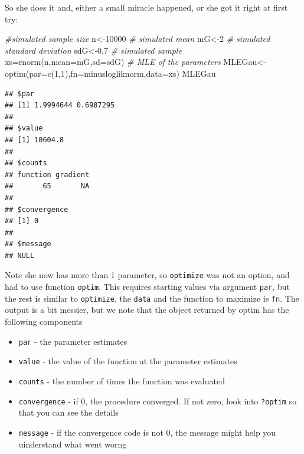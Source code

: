 \documentclass[
]{book}
\newenvironment{Shaded}{\begin{snugshade}}{\end{snugshade}}
\newcommand{\AttributeTok}[1]{\textcolor[rgb]{0.77,0.63,0.00}{#1}}
\newcommand{\CommentTok}[1]{\textcolor[rgb]{0.56,0.35,0.01}{\textit{#1}}}
\newcommand{\DecValTok}[1]{\textcolor[rgb]{0.00,0.00,0.81}{#1}}
\newcommand{\FloatTok}[1]{\textcolor[rgb]{0.00,0.00,0.81}{#1}}
\newcommand{\FunctionTok}[1]{\textcolor[rgb]{0.00,0.00,0.00}{#1}}
\newcommand{\NormalTok}[1]{#1}
\newcommand{\OtherTok}[1]{\textcolor[rgb]{0.56,0.35,0.01}{#1}}
\providecommand{\tightlist}{%
  \setlength{\itemsep}{0pt}\setlength{\parskip}{0pt}}
\begin{document}
So she does it and, either a small miracle happened, or she got it right at first try:

\begin{Shaded}
\begin{Highlighting}[]
\CommentTok{\#simulated sample size}
\NormalTok{n}\OtherTok{\textless{}{-}}\DecValTok{10000}
\CommentTok{\# simulated mean}
\NormalTok{mG}\OtherTok{\textless{}{-}}\DecValTok{2}
\CommentTok{\# simulated standard deviation}
\NormalTok{sdG}\OtherTok{\textless{}{-}}\FloatTok{0.7}
\CommentTok{\# simulated sample}
\NormalTok{xs}\OtherTok{=}\FunctionTok{rnorm}\NormalTok{(n,}\AttributeTok{mean=}\NormalTok{mG,}\AttributeTok{sd=}\NormalTok{sdG)}
\CommentTok{\# MLE of the parameters}
\NormalTok{MLEGau}\OtherTok{\textless{}{-}}\FunctionTok{optim}\NormalTok{(}\AttributeTok{par=}\FunctionTok{c}\NormalTok{(}\DecValTok{1}\NormalTok{,}\DecValTok{1}\NormalTok{),}\AttributeTok{fn=}\NormalTok{minuslogliknorm,}\AttributeTok{data=}\NormalTok{xs)}
\NormalTok{MLEGau}
\end{Highlighting}
\end{Shaded}

\begin{verbatim}
## $par
## [1] 1.9994644 0.6987295
## 
## $value
## [1] 10604.8
## 
## $counts
## function gradient 
##       65       NA 
## 
## $convergence
## [1] 0
## 
## $message
## NULL
\end{verbatim}

Note she now has more than 1 parameter, so \texttt{optimize} was not an option, and had to use function \texttt{optim}. This requires starting values via argument \texttt{par}, but the rest is similar to \texttt{optimize}, the \texttt{data} and the function to maximize is \texttt{fn}. The output is a bit messier, but we note that the object returned by optim has the following components

\begin{itemize}
\tightlist
\item
  \texttt{par} - the parameter estimates
\item
  \texttt{value} - the value of the function at the parameter estimates
\item
  \texttt{counts} - the number of times the function was evaluated
\item
  \texttt{convergence} - if 0, the procedure converged. If not zero, look into \texttt{?optim} so that you can see the details
\item
  \texttt{message} - if the convergence code is not 0, the message might help you uinderstand what went worng
\end{itemize}
\end{document}
